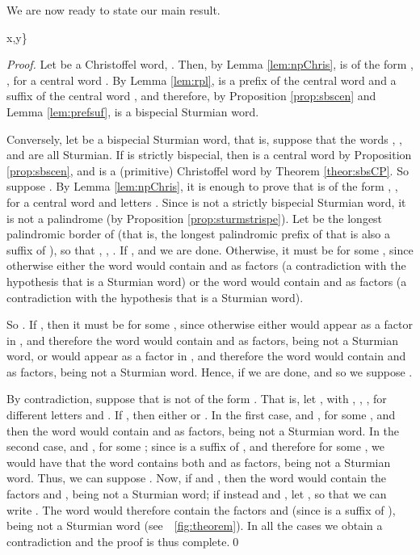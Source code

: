 \documentclass{llncs}
\begin{document}
We are now ready to state our main result.

\begin{theorem}\label{theor:main}
x,y\in \Sigma\}
\end{theorem}

\begin{proof}
 Let  be a Christoffel word, .  Then, by Lemma \ref{lem:npChris},  is of the form , , for a central word . By Lemma \ref{lem:rpl},  is a prefix of the central word  and a suffix of the central word , and therefore, by Proposition \ref{prop:sbscen} and Lemma \ref{lem:prefsuf},  is a bispecial Sturmian word.
 
 Conversely, let  be a bispecial Sturmian word, that is, suppose that the words , ,  and  are all Sturmian. If  is strictly bispecial, then  is a central word by Proposition \ref{prop:sbscen}, and  is a (primitive) Christoffel word by Theorem \ref{theor:sbsCP}. So suppose . By Lemma \ref{lem:npChris}, it is enough to prove that  is of the form , , for a central word  and letters . Since  is not a strictly bispecial Sturmian word, it is not a palindrome (by Proposition \ref{prop:sturmstrispe}). Let  be the longest palindromic border of  (that is, the longest palindromic prefix of  that is also a suffix of ), so that , , . If ,  and we are done. Otherwise, it must be  for some , since otherwise either the word  would contain  and  as factors (a contradiction with the hypothesis that  is a Sturmian word) or the word  would contain  and  as factors (a contradiction with the hypothesis that  is a Sturmian word). 
 
So . If , then it must be  for some , since otherwise either   would appear as a factor in , and therefore the word  would contain  and  as factors, being not a Sturmian word, or  would appear as a factor in , and therefore the word  would contain  and  as factors, being not a Sturmian word. Hence, if  we are done, and so we suppose . 
 
 By contradiction, suppose that  is not of the form . That is, let , with , , , for different letters  and . If , then either  or . In the first case,  and , for some , and then the word  would contain  and  as factors, being not a Sturmian word. In the second case,  and , for some ; since  is a suffix of , and therefore  for some , we would have that the word  contains both  and  as factors, being not a Sturmian word. Thus, we can suppose . Now, if  and , then the word  would contain the factors  and , being not a Sturmian word; if instead  and , let , so that we can write . The word  would therefore contain the factors  and  (since  is a suffix of ), being not a Sturmian word (see~\figurename~\ref{fig:theorem}). In all the cases we obtain a contradiction and the proof is thus complete.\qed
\end{proof}
\end{document}
